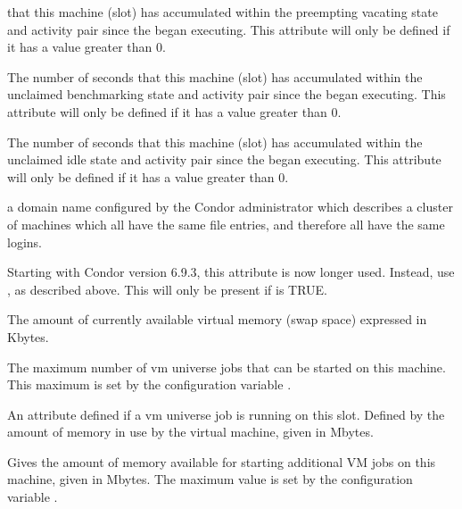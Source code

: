 \begin{description}
that this machine (slot) has accumulated within the
preempting vacating state and activity pair since the 
began executing.
This attribute will only be defined if it has a value greater than 0.
%
\item[\AdAttr{TotalTimeUnclaimedBenchmarking}:] The number of seconds
that this machine (slot) has accumulated within the
unclaimed benchmarking state and activity pair since the 
began executing.
This attribute will only be defined if it has a value greater than 0.
%
\item[\AdAttr{TotalTimeUnclaimedIdle}:] The number of seconds
that this machine (slot) has accumulated within the
unclaimed idle state and activity pair since the 
began executing.
This attribute will only be defined if it has a value greater than 0.
%
\item[\AdAttr{UidDomain}:] a domain name configured by the Condor 
administrator which describes a cluster of machines which all have 
the same  file entries, and therefore all have the same logins.
%
\item[\AdAttr{VirtualMachineID}:] 
Starting with Condor version 6.9.3, this attribute is now longer used.
Instead, use , as described above.
This will only be present if  is TRUE.
%
\item[\AdAttr{VirtualMemory}:] The amount of currently available virtual memory 
(swap space) expressed in Kbytes.
%
\item[\AdAttr{VM\_AvailNum}:] The maximum number of vm universe jobs that
can be started on this machine. This maximum is set by the configuration
variable . 
%
\item[\AdAttr{VM\_Guest\_Mem}:] An attribute defined if a vm universe job
is running on this slot.  Defined by the amount of memory in use by the 
virtual machine, given in Mbytes.
%
\item[\AdAttr{VM\_Memory}:] Gives the amount of memory available for starting 
additional VM jobs on this machine, given in Mbytes.
The maximum value is set by the configuration variable .

\end{description}
